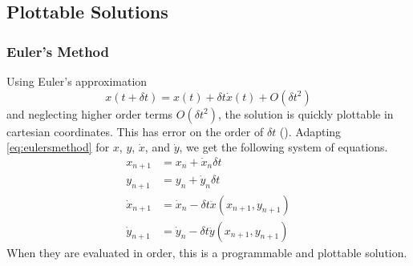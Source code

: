 \documentclass[preprint,titlepage,preprintnumbers,amsmath,amssymb,aps,11pt]{revtex4-2}
\begin{document}
\subsection{Plottable Solutions}
\subsubsection{Euler's Method}
Using Euler's approximation
\begin{equation}
    x(t+\delta t)=x(t)+\delta t\dot{x}(t)+O(\delta t^2)
    \label{eq:eulersmethod}
\end{equation}
and neglecting higher order terms $O(\delta t^2)$, the solution is quickly plottable in cartesian coordinates. This has error on the order of $\delta t$ (\cite[p. 298]{Wild1980}).
Adapting \ref{eq:eulersmethod} for $x$, $y$, $\dot{x}$, and $\dot{y}$, we get the following system of equations.
\begin{equation}
    \begin{aligned}
        x_{n+1}       & =x_n+\dot{x}_n\delta t                       \\
        y_{n+1}       & =y_n+\dot{y}_n\delta t                       \\
        \dot{x}_{n+1} & =\dot{x}_n-\delta t\ddot{x}(x_{n+1},y_{n+1}) \\
        \dot{y}_{n+1} & =\dot{y}_n-\delta t\ddot{y}(x_{n+1},y_{n+1})
    \end{aligned}
\end{equation}
When they are evaluated in order, this is a programmable and plottable solution.
\end{document}
